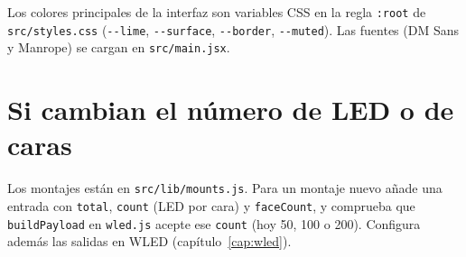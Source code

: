 Los colores principales de la interfaz son variables CSS en la regla \texttt{:root} de \texttt{src/styles.css} (\texttt{-{}-lime}, \texttt{-{}-surface}, \texttt{-{}-border}, \texttt{-{}-muted}). Las fuentes (DM Sans y Manrope) se cargan en \texttt{src/main.jsx}.

\section{Si cambian el número de LED o de caras}

Los montajes están en \texttt{src/lib/mounts.js}. Para un montaje nuevo añade una entrada con \texttt{total}, \texttt{count} (LED por cara) y \texttt{faceCount}, y comprueba que \texttt{buildPayload} en \texttt{wled.js} acepte ese \texttt{count} (hoy 50, 100 o 200). Configura además las salidas en WLED (capítulo~\ref{cap:wled}).

